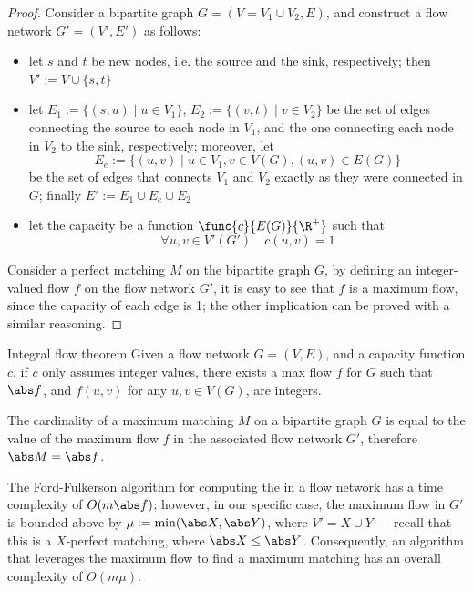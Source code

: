 \documentclass[a4paper, 12pt]{report}
\begin{document}
    \begin{proof}
        Consider a bipartite graph $G = (V = V_1 \cup V_2, E)$, and construct a flow network $G' = (V', E')$ as follows:

        \begin{itemize}
            \item let $s$ and $t$ be new nodes, i.e. the source and the sink, respectively; then $V' := V \cup \{s, t\}$
            \item let $E_1 := \{(s, u) \mid u \in V_1\}$, $E_2 := \{(v, t) \mid v \in V_2\}$ be the set of edges connecting the source to each node in $V_1$, and the one connecting each node in $V_2$ to the sink, respectively; moreover, let $$E_e := \{(u, v) \mid u \in V_1 , v \in V(G), (u, v) \in E(G)\}$$ be the set of edges that connects $V_1$ and $V_2$ exactly as they were connected in $G$; finally $E' := E_1 \cup E_e \cup E_2$
            \item let the capacity be a function $\func{c}{E(G)}{\R^+}$ such that $$\forall u, v \in V'(G') \quad c(u, v) = 1$$
        \end{itemize}

         

        Consider a perfect matching $M$ on the bipartite graph $G$, by defining an integer-valued flow $f$ on the flow network $G'$, it is easy to see that $f$ is a maximum flow, since the capacity of each edge is 1; the other implication can be proved with a similar reasoning.
    \end{proof}

    \begin{framedthm}{Integral flow theorem}
        Given a flow network $G = (V, E)$, and a capacity function $c$, if $c$ only assumes integer values, there exists a max flow $f$ for $G$ such that $\abs f$, and $f(u, v)$ for any $u, v \in V(G)$, are integers.
    \end{framedthm}

    \begin{framedcor}{}
        The cardinality of a maximum matching $M$ on a bipartite graph $G$ is equal to the value of the maximum flow $f$ in the associated flow network $G'$, therefore $\abs M = \abs f$.
    \end{framedcor}

    The \href{https://en.wikipedia.org/wiki/Ford%E2%80%93Fulkerson_algorithm}{Ford-Fulkerson algorithm} for computing the \tit{maximum flow} in a flow network has a time complexity of $O(m \abs f)$; however, in our specific case, the maximum flow in $G'$ is bounded above by $\mu := \min(\abs X, \abs Y)$, where $V' = X \cup Y$ --- recall that this is a $X$-perfect matching, where $\abs X \le \abs Y$. Consequently, an algorithm that leverages the maximum flow to find a maximum matching has an overall complexity of $O(m \mu)$.
\end{document}
